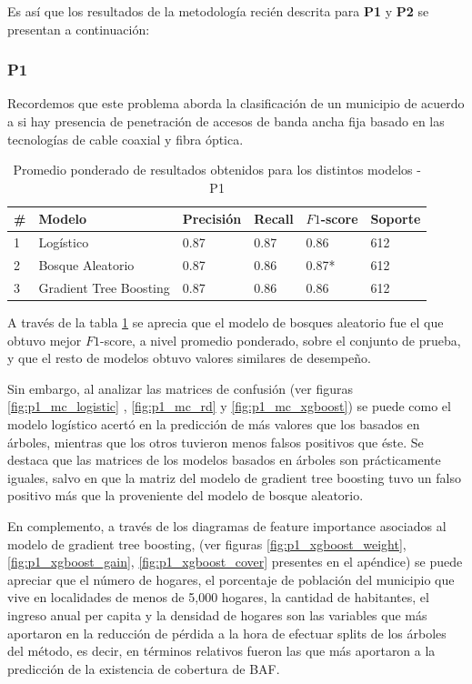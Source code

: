 \documentclass[9pt,twocolumn,twoside]{ilcss}
\begin{document}
Es así que los resultados de la metodología recién descrita para \textbf{P1} y \textbf{P2} se presentan a continuación:

\subsubsection{P1}

Recordemos que este problema aborda la clasificación de un municipio de acuerdo a si hay presencia de penetración de accesos de banda ancha fija basado en las tecnologías de cable coaxial y fibra óptica. 

\begin{table}[tbhp]
	\centering
	\caption{Promedio ponderado de resultados obtenidos para los distintos modelos - P1 }
	\label{tab:p1_results}
	\begin{tabular}{@{}llllll@{}}
		\toprule
		\# & Modelo & Precisión & Recall & $F1$-score & Soporte \\ \midrule
		1 & Logístico & 0.87 & 0.87 & 0.86 & 612 \\
		2 & Bosque Aleatorio & 0.87 & 0.86 & 0.87* & 612 \\
		3 & Gradient Tree Boosting & 0.87 & 0.86 & 0.86 & 612 \\ \bottomrule
	\end{tabular}
\end{table}

A través de la tabla \ref{tab:p1_results} se aprecia que el modelo de bosques aleatorio fue el que obtuvo mejor $F1$-score, a nivel promedio ponderado, sobre el conjunto de prueba, y que el resto de modelos obtuvo valores similares de desempeño.

Sin embargo, al analizar las matrices de confusión (ver figuras \ref{fig:p1_mc_logistic} , \ref{fig:p1_mc_rd} y \ref{fig:p1_mc_xgboost}) se puede como el modelo logístico
acertó en la predicción de más valores que los basados en árboles, mientras que los otros tuvieron menos falsos positivos que éste. Se destaca que las matrices de los modelos basados en árboles son prácticamente iguales, salvo en que la matriz del modelo de gradient tree boosting tuvo un falso positivo más que la proveniente del modelo de bosque aleatorio.

En complemento, a través de los diagramas de feature importance asociados al modelo de gradient tree  boosting, (ver figuras \ref{fig:p1_xgboost_weight}, \ref{fig:p1_xgboost_gain}, \ref{fig:p1_xgboost_cover} presentes en el apéndice) se puede apreciar que el número de hogares, el porcentaje de población del municipio que vive en localidades de menos de 5,000 hogares, la cantidad de habitantes, el ingreso anual per capita y la densidad de hogares son las variables que más aportaron en la reducción de pérdida a la hora de efectuar splits de los árboles del método, es decir, en términos relativos fueron las que más aportaron a la predicción de la existencia de cobertura de BAF.
\end{document}
